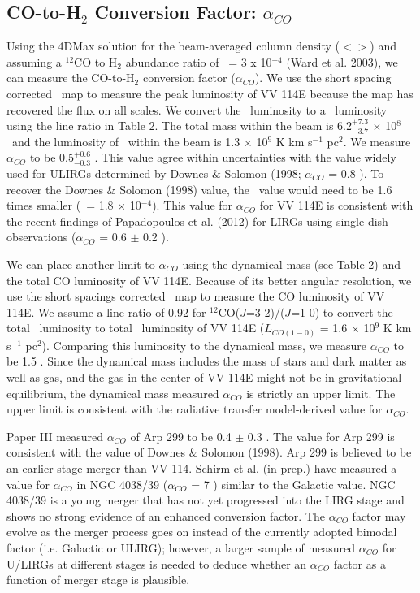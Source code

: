 \subsection{CO-to-H$_{2}$ Conversion Factor: $\alpha_{CO}$}%
Using the 4DMax solution for the beam-averaged column density ($<$\nco$>$) and assuming a $^{12}$CO to H$_{2}$ abundance ratio of \xh\ = 3 x 10$^{-4}$ (Ward et al. 2003)\nocite{2003ApJ...587..171W}, we can measure the CO-to-H$_{2}$ conversion factor ($\alpha_{CO}$). We use the short spacing corrected \cotwo\ map to measure the peak luminosity of VV 114E because the map has recovered the flux on all scales. We convert the \cotwo\ luminosity to a \coone\ luminosity using the line ratio in Table 2. The total mass within the beam is 6.2$^{+7.3}_{-3.7}$ $\times$ 10$^{8}$ \msol\ and the luminosity of \coone\ within the beam is 1.3 $\times$ 10$^{9}$ K km s$^{-1}$ pc$^{2}$. We measure $\alpha_{CO}$ to be 0.5$^{+0.6}_{-0.3}$ \alphaco. This value agree within uncertainties with the value widely used for ULIRGs determined by Downes $\&$ Solomon (1998; $\alpha_{CO}$ = 0.8 \alphaco). To recover the Downes $\&$ Solomon (1998)\nocite{1998ApJ...507..615D} value, the \xh\ value would need to be 1.6 times smaller (\xh\ = 1.8 $\times$ 10$^{-4}$).  This value for $\alpha_{CO}$ for VV 114E is consistent with the recent findings of Papadopoulos et al. (2012) for LIRGs using single dish observations ($\alpha_{CO}$ = 0.6 $\pm$ 0.2  \alphaco). 

We can place another limit to $\alpha_{CO}$ using the dynamical mass (see Table 2) and the total CO luminosity of VV 114E. Because of its better angular resolution, we use the short spacings corrected \cothree\ map to measure the CO luminosity of VV 114E. We assume a line ratio of 0.92 for $^{12}$CO($J$=3-2)/($J$=1-0) to convert the total \cothree\ luminosity to total \coone\ luminosity of VV 114E ($L_{CO(1-0)}$ = 1.6 $\times$ 10$^{9}$ K km s$^{-1}$ pc$^{2}$).  Comparing this luminosity to the dynamical mass, we measure $\alpha_{CO}$ to be 1.5 \alphaco. Since the dynamical mass includes the mass of stars and dark matter as well as gas, and the gas in the center of VV 114E might not be in gravitational equilibrium, the dynamical mass measured $\alpha_{CO}$ is strictly an upper limit. The upper limit is consistent with the radiative transfer model-derived value for $\alpha_{CO}$.

Paper III measured $\alpha_{CO}$ of Arp 299 to be 0.4 $\pm$ 0.3 \alphaco. The value for Arp 299 is consistent with the value of Downes $\&$ Solomon (1998). Arp 299 is believed to be an earlier stage merger than VV 114. Schirm et al. (in prep.) have measured a value for $\alpha_{CO}$ in NGC 4038/39 ($\alpha_{CO}$ = 7 \alphaco) similar to the Galactic value. NGC 4038/39 is a young merger that has not yet progressed into the LIRG stage and shows no strong evidence of an enhanced conversion factor. The $\alpha_{CO}$ factor may evolve as the merger process goes on instead of the currently adopted bimodal factor (i.e. Galactic or ULIRG); however, a larger sample of measured $\alpha_{CO}$ for U/LIRGs at different stages is needed to deduce whether an $\alpha_{CO}$ factor as a function of merger stage is plausible. 


